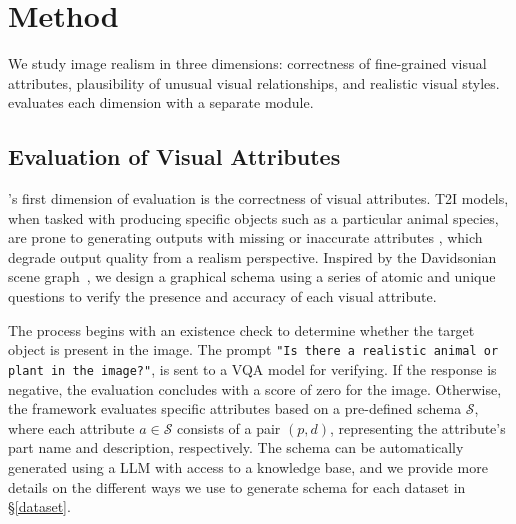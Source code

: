 \section{Method}
We study image realism in three dimensions: correctness of fine-grained visual attributes, plausibility of unusual visual relationships, and realistic visual styles. \name evaluates each dimension with a separate module.

\subsection{Evaluation of Visual Attributes}
\name's first dimension of evaluation is the correctness of visual attributes. T2I models, when tasked with producing specific objects such as a particular animal species, are prone to generating outputs with missing or inaccurate attributes \cite{huang2024t2i, parihar2024precisecontrol}, which degrade output quality from a realism perspective. Inspired by the Davidsonian scene graph~\cite{chodavidsonian}, we design a graphical schema using a series of atomic and unique questions to verify the presence and accuracy of each visual attribute.

The process begins with an existence check to determine whether the target object is present in the image. The prompt \texttt{"Is there a realistic animal or plant in the image?"}, is sent to a VQA model for verifying. If the response is negative, the evaluation concludes with a score of zero for the image. Otherwise, the framework evaluates specific attributes based on a pre-defined schema $\mathcal{S}$, where each attribute $a \in \mathcal{S}$ consists of a pair $(p, d)$, representing the attribute's part name and description, respectively. The schema can be automatically generated using a LLM with access to a knowledge base, and we provide more details on the different ways we use to generate schema for each dataset in \S\ref{dataset}.

